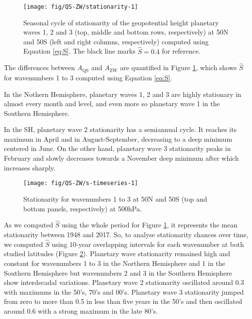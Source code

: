 \documentclass[draft,linenumbers]{agujournal2018}
\begin{document}
\begin{figure}[h]

{\centering \texttt{[image: fig/QS-ZW/stationarity-1]} 

}

\caption{Seasonal cycle of stationarity of the geopotential height planetary waves 1, 2 and 3 (top, middle and bottom rows, respectively) at 50\degree N and 50\degree S (left and right columns, respectively) computed using Equation \ref{eq:S}. The black line marks $\hat{S} = 0.4$ for reference.}\label{fig:stationarity}
\end{figure}

The differences between \(A_\mathrm{QS}\) and
\(\overline{A_\mathrm{ZW}}\) are quantified in Figure
\ref{fig:stationarity}, which shows \(\hat{S}\) for wavenumbers 1 to 3
computed using Equation \ref{eq:S}.

In the Nothern Hemisphere, planetary waves 1, 2 and 3 are highly
stationary in almost every month and level, and even more so planetary
wave 1 in the Southern Hemisphere.

In the SH, planetary wave 2 stationarity has a semiannual cycle. It
reaches its maximum in April and in August-September, decreasing to a
deep minimum centered in June. On the other hand, planetary wave 3
stationarity peaks in February and slowly decreases towards a November
deep minimum after which increases sharply.

\begin{figure}[h]

{\centering \texttt{[image: fig/QS-ZW/s-timeseries-1]} 

}

\caption{Stationarity for wavenumbers 1 to 3 at 50\degree N and  50\degree S (top and bottom panels, respectively) at 500hPa.}\label{fig:s-timeseries}
\end{figure}

As we computed \(\hat{S}\) using the whole period for Figure
\ref{fig:stationarity}, it represents the mean stationarity between 1948
and 2017. So, to analyse stationarity chances over time, we computed
\(\hat{S}\) using 10-year overlapping intervals for each wavenumber at
both studied latitudes (Figure \ref{fig:s-timeseries}). Planetary wave
stationarity remained high and constant for wavenumbers 1 to 3 in the
Northern Hemisphere and 1 in the Southern Hemisphere but wavenumbers 2
and 3 in the Southern Hemisphere show interdecadal variations. Planetary
wave 2 stationarity oscillated around 0.3 with maximums in the 50's,
70's and 00's. Planetary wave 3 stationarity jumped from zero to more
than 0.5 in less than five years in the 50's and then oscillated around
0.6 with a strong maximum in the late 80's.
\end{document}
